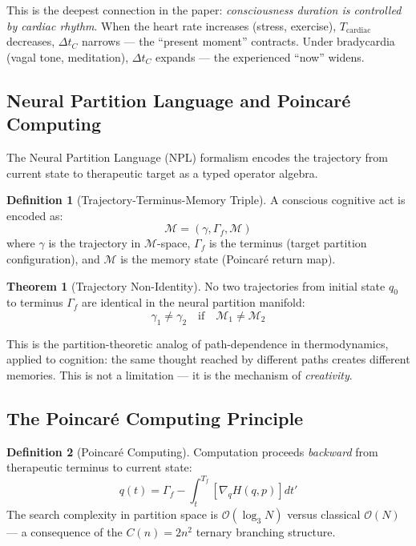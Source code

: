 \documentclass[12pt,a4paper]{article}
\theoremstyle{definition}
\newtheorem{theorem}{Theorem}
\newtheorem{definition}{Definition}
\newcommand{\calM}{\mathcal{M}}
\begin{document}
This is the deepest connection in the paper: \emph{consciousness duration is
controlled by cardiac rhythm}. When the heart rate increases (stress, exercise),
$T_{\text{cardiac}}$ decreases, $\Delta t_C$ narrows — the ``present moment''
contracts. Under bradycardia (vagal tone, meditation), $\Delta t_C$ expands —
the experienced ``now'' widens.

\subsection{Neural Partition Language and Poincaré Computing}

The Neural Partition Language (NPL) formalism encodes the trajectory from
current state to therapeutic target as a typed operator algebra.

\begin{definition}[Trajectory-Terminus-Memory Triple]
A conscious cognitive act is encoded as:
\begin{equation}
\mathcal{M} = (\gamma, \Gamma_f, \mathcal{M})
\end{equation}
where $\gamma$ is the trajectory in $\calM$-space, $\Gamma_f$ is the
terminus (target partition configuration), and $\mathcal{M}$ is the memory
state (Poincaré return map).
\end{definition}

\begin{theorem}[Trajectory Non-Identity]
No two trajectories from initial state $q_0$ to terminus $\Gamma_f$ are
identical in the neural partition manifold:
\begin{equation}
\gamma_1 \neq \gamma_2 \quad \text{if} \quad \mathcal{M}_1 \neq \mathcal{M}_2
\end{equation}
\end{theorem}

This is the partition-theoretic analog of path-dependence in thermodynamics,
applied to cognition: the same thought reached by different paths creates
different memories. This is not a limitation — it is the mechanism of
\emph{creativity}.

\subsection{The Poincaré Computing Principle}

\begin{definition}[Poincaré Computing]
Computation proceeds \emph{backward} from therapeutic terminus to current state:
\begin{equation}
q(t) = \Gamma_f - \int_t^{T_f} \left[\nabla_q H(q,p)\right] dt'
\end{equation}
The search complexity in partition space is $\mathcal{O}(\log_3 N)$
versus classical $\mathcal{O}(N)$ — a consequence of the $C(n) = 2n^2$
ternary branching structure.
\end{definition}
\end{document}
